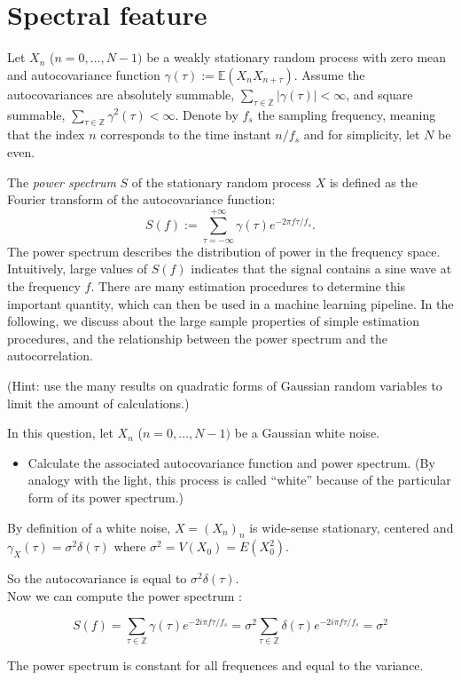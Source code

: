 \documentclass[11pt]{article}
\begin{document}
\section{Spectral feature}

Let $X_n$ ($n=0,\dots,N-1)$ be a weakly stationary random process with zero mean and autocovariance function $\gamma(\tau):= \mathbb{E}(X_n X_{n+\tau})$.
Assume the autocovariances are absolutely summable, \ie $\sum_{\tau\in\mathbb{Z}} |\gamma(\tau)| < \infty$, and square summable, \ie $\sum_{\tau\in\mathbb{Z}} \gamma^2(\tau) < \infty$.
Denote by $f_s$ the sampling frequency, meaning that the index $n$ corresponds to the time instant $n / f_s$ and for simplicity, let $N$ be even.


The \textit{power spectrum} $S$ of the stationary random process $X$ is defined as the Fourier transform of the autocovariance function:
\begin{equation}
    S(f) := \sum_{\tau=-\infty}^{+\infty}\gamma(\tau)e^{-2\pi f\tau/f_s}.
\end{equation}
The power spectrum describes the distribution of power in the frequency space. 
Intuitively, large values of $S(f)$ indicates that the signal contains a sine wave at the frequency $f$.
There are many estimation procedures to determine this important quantity, which can then be used in a machine learning pipeline.
In the following, we discuss about the large sample properties of simple estimation procedures, and the relationship between the power spectrum and the autocorrelation.

(Hint: use the many results on quadratic forms of Gaussian random variables to limit the amount of calculations.)

\begin{exercise}
    In this question, let $X_n$ ($n=0,\dots,N-1)$ be a Gaussian white noise.

    \begin{itemize}
        \item Calculate the associated autocovariance function and power spectrum. (By analogy with the light, this process is called ``white'' because of the particular form of its power spectrum.)
    \end{itemize}

\end{exercise}

\begin{solution}

    By definition of a white noise, $X=(X_n)_n$ is wide-sense stationary, centered and $\gamma_X(\tau)=\sigma^2 \delta(\tau)$ where $\sigma^2 = V(X_0)=E(X_0^2)$. 

    So the autocovariance is equal to $\sigma^2\delta(\tau)$.\\
    Now we can compute the power spectrum :

    $$S(f) = \sum_{\tau \in \mathbb{Z}} \gamma(\tau) e^{-2i\pi f\tau/f_s}=\sigma^2 \sum_{\tau \in \mathbb{Z}} \delta(\tau) e^{-2i\pi f\tau/f_s}=\sigma^2 $$

    The power spectrum is constant for all frequences and equal to the variance.

\end{solution}
\end{document}
